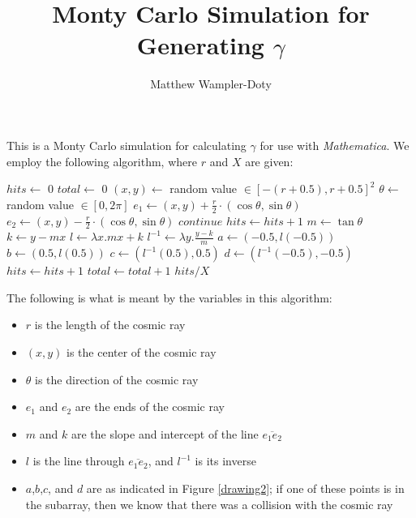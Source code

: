 \documentclass[a4paper,12pt,final]{article}
\begin{document}
\title{Monty Carlo Simulation for Generating $\gamma$}
\date{}
\author{Matthew Wampler-Doty }

\maketitle
\setlength{\parskip}{0.15in}

This is a Monty Carlo simulation for calculating $\gamma$ for
use with \emph{Mathematica}.  We employ the following algorithm, where
$r$ and $X$ are given:\\

\begin{algorithmic}
\STATE $hits \gets$ 0
\STATE $total \gets$ 0
             \STATE $(x,y) \gets $ random value
             $\in [-(r+0.5),r+0.5]^2$
             \STATE $\theta \gets$ random value $\in [0,2 \pi]$
             \STATE $e_1 \gets (x,y) + \frac{r}{2}\cdot (\cos\theta, \sin\theta)$
             \STATE $e_2 \gets (x,y) - \frac{r}{2}\cdot(\cos\theta,
             \sin\theta)$
              \STATE $continue$ \ENDIF
                    \STATE $hits \gets hits + 1$
             \ELSE
                    \STATE $m \gets  \tan \theta$
                    \STATE $k \gets y - m x$
                    \STATE $l \gets \lambda x. m x + k$
                    \STATE $l^{-1}\gets \lambda y. \frac{y - k}{m}$
                    \STATE $a \gets \left(-0.5,l(-0.5)\right)$
                    \STATE $b \gets \left(0.5,l(0.5)\right)$
                    \STATE $c \gets \left(l^{-1}(0.5),0.5\right)$
                    \STATE $d \gets \left(l^{-1}(-0.5),-0.5\right)$
                       \STATE $hits \gets hits + 1$
                    \ENDIF
             \ENDIF
             \STATE $total \gets total + 1$
\ENDWHILE
\RETURN $hits/X$
\end{algorithmic}
The following is what is meant by the variables in this algorithm:
\begin{itemize}
\item $r$ is the length of the cosmic ray
\item $(x,y)$ is the center of the cosmic ray
\item $\theta$ is the direction of the cosmic ray
\item $e_1$ and $e_2$ are the ends of the cosmic ray
\item $m$ and $k$ are the slope and intercept of the line
  $\overline{e_1e_2}$
\item $l$ is the line through $\overline{e_1e_2}$, and $l^{-1}$ is its inverse
\item $a$,$b$,$c$, and $d$ are as indicated in Figure \ref{drawing2};
  if one of these points is in the subarray, then we know that there
  was a collision with the cosmic ray
\end{itemize}
\end{document}
